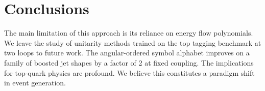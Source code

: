\section{Conclusions}\label{sec:conclusions}

The main limitation of this approach is its reliance on energy flow
polynomials. We leave the study of unitarity methods trained on the top
tagging benchmark at two loops to future work. The angular-ordered
symbol alphabet improves on a family of boosted jet shapes by a factor
of 2 at fixed coupling. The implications for top-quark physics are
profound. We believe this constitutes a paradigm shift in event
generation.

